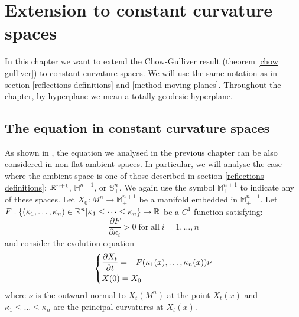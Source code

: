 \chapter{Extension to constant curvature spaces}
In this chapter we want to extend the Chow-Gulliver result (theorem \ref{chow gulliver}) to constant curvature spaces. We will use the same notation as in section 
\ref{reflections definitions} and \ref{method moving planes}. 
Throughout the chapter, by hyperplane we mean a totally geodesic hyperplane. 

\section{The equation in constant curvature spaces}	
As shown in \cite{huisken}, the equation we analysed in the previous chapter can be also considered in non-flat ambient spaces. In particular, we will analyse the case where the ambient space is one of those described  in section \ref{reflections definitions}: $\mathbb{R}^{n+1}$, $\mathbb{H}^{n+1}$, or $\mathbb{S}^n_+$. We again use the symbol $\mathbb{M}^{n+1}_+$ to indicate any of these spaces. 
Let $X_0 : M^n \rightarrow \mathbb{M}^{n+1}_+$ be a manifold embedded in $\mathbb{M}^{n+1}_+$. 
Let $F:\{(\kappa_1, \dots , \kappa_n)\in \mathbb{R}^n\vert \kappa_1\leq \dots \leq \kappa_n\}\rightarrow \mathbb{R}$ be a $C^1$ function satisfying:
\begin{equation}
	\frac{\partial F}{\partial \kappa_i} > 0 \mathrm{\; for \; all } \; i=1,\dots, n \label{parabolicità_ext}
\end{equation}
and consider the evolution equation 
\begin{align}
	\begin{dcases}
		\frac{\partial X_t}{\partial t} = - F(\kappa_1(x), \dots , \kappa_n(x)) \nu\\
		X(0)= X_0
	\end{dcases} \label{evolutioneq_ext}
\end{align}
where $\nu$ is the outward normal to $X_t(M^n)$ at the point $X_t(x)$ and $\kappa_1\leq \dots \leq \kappa_n$ are the principal curvatures at $X_t(x)$. 

